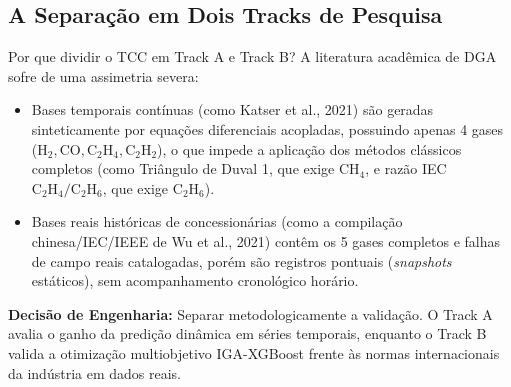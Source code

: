 \documentclass[11pt,a4paper]{article}
\begin{document}
\subsection{A Separação em Dois Tracks de Pesquisa}
\begin{decisionBox}{Por que dividir o TCC em Track A e Track B?}
A literatura acadêmica de DGA sofre de uma assimetria severa:
\begin{itemize}
  \item Bases temporais contínuas (como Katser et al., 2021) são geradas sinteticamente por equações diferenciais acopladas, possuindo apenas 4 gases ($\text{H}_2, \text{CO}, \text{C}_2\text{H}_4, \text{C}_2\text{H}_2$), o que impede a aplicação dos métodos clássicos completos (como Triângulo de Duval 1, que exige $\text{CH}_4$, e razão IEC $\text{C}_2\text{H}_4/\text{C}_2\text{H}_6$, que exige $\text{C}_2\text{H}_6$).
  \item Bases reais históricas de concessionárias (como a compilação chinesa/IEC/IEEE de Wu et al., 2021) contêm os 5 gases completos e falhas de campo reais catalogadas, porém são registros pontuais (\textit{snapshots} estáticos), sem acompanhamento cronológico horário.
\end{itemize}
\textbf{Decisão de Engenharia:} Separar metodologicamente a validação. O Track A avalia o ganho da predição dinâmica em séries temporais, enquanto o Track B valida a otimização multiobjetivo IGA-XGBoost frente às normas internacionais da indústria em dados reais.
\end{decisionBox}
\end{document}
